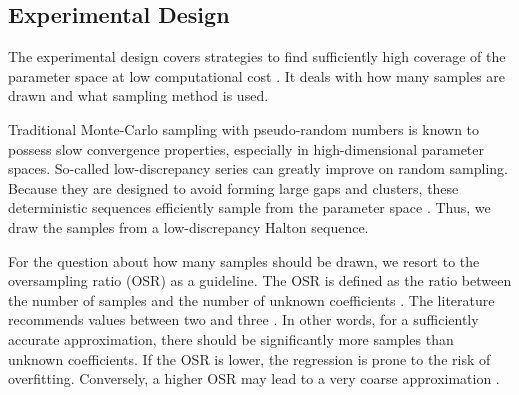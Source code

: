 \subsection{Experimental Design}
\label{sec:sampling}



The experimental design covers strategies to find sufficiently high coverage
of the parameter space at low computational cost \cite{fajraoui_optimal_2017,usher_value_2015}.
It deals with how many samples are drawn and what sampling method is used.


Traditional Monte-Carlo sampling with pseudo-random numbers is known to
possess slow convergence properties, %
especially in high-dimensional parameter spaces.
So-called low-discrepancy series can greatly improve on random sampling.
Because they are designed to avoid forming large gaps and clusters,
these deterministic sequences efficiently sample from the parameter space \cite{fajraoui_optimal_2017}.
Thus, we draw the samples from a low-discrepancy Halton sequence.


For the question about how many samples should be drawn,
we resort to the oversampling ratio (OSR) as a guideline.
The OSR is defined as the ratio between the number of samples
and the number of unknown coefficients \cite{palar_multi-fidelity_2016}.
The literature recommends values between two and three \cite{hosder2007,palar_multi-fidelity_2016,fajraoui_optimal_2017,gratiet_metamodel-based_2015}.
In other words, for a sufficiently accurate approximation,
there should be significantly more samples than unknown coefficients.
If the OSR is lower, the regression is prone to the risk of overfitting.
Conversely, a higher OSR may lead to a very coarse approximation \cite{palar_multi-fidelity_2016}.


